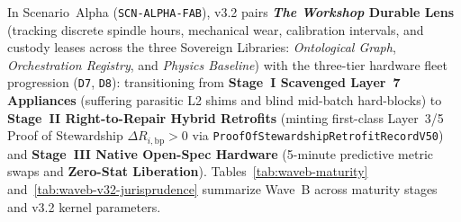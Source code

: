 In Scenario~Alpha (\texttt{SCN-ALPHA-FAB}), v3.2 pairs \textbf{\textit{The Workshop} Durable Lens}
(tracking discrete spindle hours, mechanical wear, calibration intervals, and custody leases across
the three Sovereign Libraries: \textit{Ontological Graph}, \textit{Orchestration Registry}, and
\textit{Physics Baseline}) with the three-tier hardware fleet progression (\texttt{D7},
\texttt{D8}): transitioning from \textbf{Stage~I Scavenged Layer~7 Appliances} (suffering parasitic
L2 shims and blind mid-batch hard-blocks) to \textbf{Stage~II Right-to-Repair Hybrid Retrofits}
(minting first-class Layer~3/5 Proof of Stewardship $\Delta R_{i,\mathrm{bp}} > 0$ via
\texttt{ProofOfStewardshipRetrofitRecordV50}) and \textbf{Stage~III Native Open-Spec Hardware}
(5-minute predictive metric swaps and \textbf{Zero-Stat Liberation}). Tables~\ref{tab:waveb-maturity}
and~\ref{tab:waveb-v32-jurisprudence} summarize Wave~B across maturity stages and v3.2 kernel
parameters.

\begin{table}[htbp]
\centering
\caption{Wave B (\texttt{Gamma}, \texttt{Alpha}, \texttt{Beta}) Layer~5 Governance Across Convivial Maturity Stages}
\label{tab:waveb-maturity}
\footnotesize
{}
\end{table}

